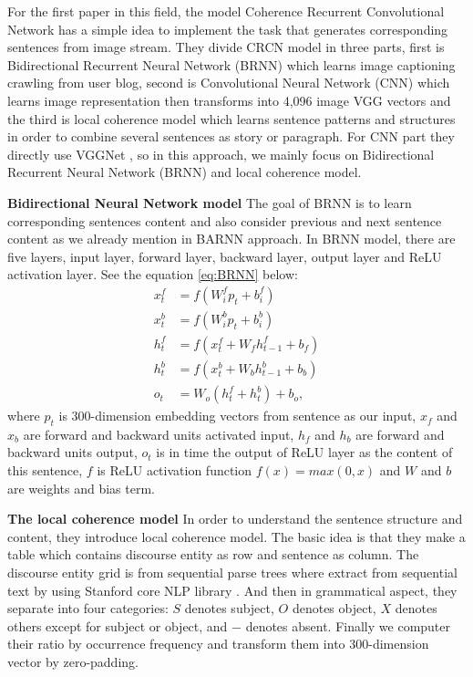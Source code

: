 \documentclass[11pt]{article}
\begin{document}
For the first paper in this field, the model Coherence Recurrent Convolutional Network has a simple idea to implement the task that generates corresponding sentences from image stream. They divide CRCN model in three parts, first is Bidirectional Recurrent Neural Network (BRNN) which learns image captioning crawling from user blog, second is Convolutional Neural Network (CNN) which learns image representation then transforms into 4,096 image VGG vectors and the third is local coherence model \cite{Barzilay:2008:MLC:1350986.1350987} which learns sentence patterns and structures in order to combine several sentences as story or paragraph. For CNN part they directly use VGGNet \cite{Simonyan14c}, so in this approach, we mainly focus on Bidirectional Recurrent Neural Network (BRNN) and local coherence model.

{\bf Bidirectional Neural Network model} The goal of BRNN is to learn corresponding sentences content and also consider previous and next sentence content as we already mention in BARNN approach. In BRNN model, there are five layers, input layer, forward layer, backward layer, output layer and ReLU activation layer. See the equation \ref{eq:BRNN} below:
\begin{equation}
\begin{aligned}
x_{t}^{f} &= f(W_{i}^{f}p_{t}+b_{i}^{f}) \\
x_{t}^{b} &= f(W_{i}^{b}p_{t}+b_{i}^{b}) \\
h_{t}^{f} &= f(x_{t}^{f} + W_{f}h_{t-1}^{f}+b_{f}) \\
h_{t}^{b} &= f(x_{t}^{b} + W_{b}h_{t-1}^{b}+b_{b}) \\
o_{t} &= W_{o}(h_{t}^{f} + h_{t}^{b}) + b_{o}, 
\end{aligned}
\label{eq:BRNN}
\end{equation} 
where $p_t$ is 300-dimension embedding vectors from sentence as our input, $x_f$ and $x_b$ are forward and backward units activated input, $h_f$ and $h_b$ are forward and backward units output, $o_t$ is in time the output of ReLU layer as the content of this sentence, $f$ is ReLU activation function $f(x) = max(0,x)$ and $W$ and $b$ are weights and bias term. 


{\bf The local coherence model} In order to understand the sentence structure and content, they introduce local coherence model. The basic idea is that they make a table which contains discourse entity as row and sentence as column. The discourse entity grid is from sequential parse trees where extract from sequential text by using Stanford core NLP library \cite{manningetal2014}. And then in grammatical aspect, they separate into four categories: $S$ denotes subject, $O$ denotes object, $X$ denotes others except for subject or object, and $-$ denotes absent. Finally we computer their ratio by occurrence frequency and transform them into 300-dimension vector by zero-padding.
\end{document}
